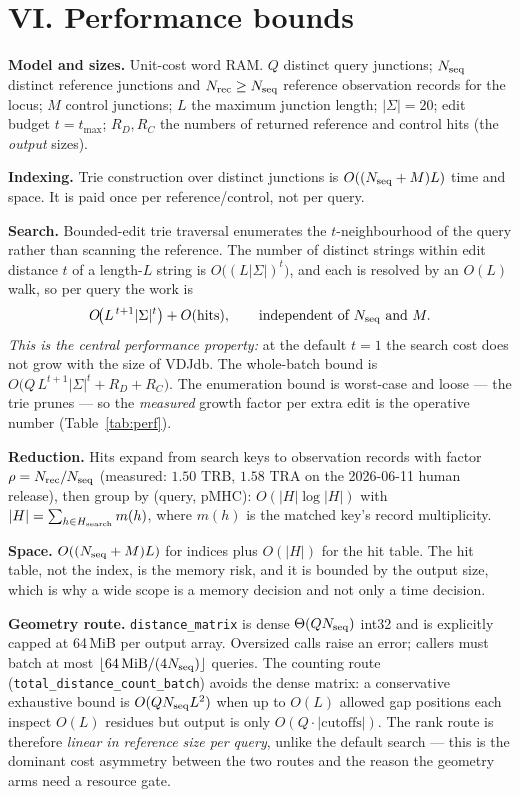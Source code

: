 \documentclass[10pt,a4paper]{article}
\theoremstyle{definition}
\newcommand{\code}[1]{\texttt{\small #1}}
\begin{document}
\part*{VI. Performance bounds}
\label{sec:perf}

\textbf{Model and sizes.} Unit-cost word RAM. $Q$ distinct query junctions; $N_{\rm seq}$ distinct
reference junctions and $N_{\rm rec}\ge N_{\rm seq}$ reference observation records for the locus;
$M$ control junctions; $L$ the maximum junction length; $|\Sigma|=20$; edit budget $t=t_{\max}$;
$R_D,R_C$ the numbers of returned reference and control hits (the \emph{output} sizes).

\textbf{Indexing.} Trie construction over distinct junctions is $O((N_{\rm seq}+M)L)$ time and
space. It is paid once per reference/control, not per query.

\textbf{Search.} Bounded-edit trie traversal enumerates the $t$-neighbourhood of the query rather
than scanning the reference. The number of distinct strings within edit distance $t$ of a length-$L$
string is $O\!\big((L|\Sigma|)^t\big)$, and each is resolved by an $O(L)$ walk, so per query the
work is
\[
O\!\big(L^{\,t+1}|\Sigma|^{t}\big)+O(\text{hits}),\qquad\text{independent of } N_{\rm seq}\text{ and } M .
\]
\emph{This is the central performance property:} at the default $t=1$ the search cost does not grow
with the size of VDJdb. The whole-batch bound is
$O\!\big(Q\,L^{t+1}|\Sigma|^{t}+R_D+R_C\big)$. The enumeration bound is worst-case and loose --- the
trie prunes --- so the \emph{measured} growth factor per extra edit is the operative number
(Table~\ref{tab:perf}).

\textbf{Reduction.} Hits expand from search keys to observation records with factor
$\rho=N_{\rm rec}/N_{\rm seq}$ (measured: $1.50$ TRB, $1.58$ TRA on the 2026-06-11 human release),
then group by (query, pMHC): $O(|H|\log|H|)$ with $|H|=\sum_{h\in H_{\rm search}}m(h)$, where $m(h)$ is the matched key's record multiplicity.

\textbf{Space.} $O((N_{\rm seq}+M)L)$ for indices plus $O(|H|)$ for the hit table. The hit table,
not the index, is the memory risk, and it is bounded by the output size, which is why a wide scope
is a memory decision and not only a time decision.

\textbf{Geometry route.} \code{distance\_matrix} is dense $\Theta(QN_{\rm seq})$ int32 and is
explicitly capped at 64\,MiB per output array. Oversized calls raise an error; callers must batch at most
$\lfloor 64\,\text{MiB}/(4N_{\rm seq})\rfloor$ queries. The counting route
(\code{total\_distance\_count\_batch}) avoids the dense matrix: a conservative exhaustive bound is
$O(QN_{\rm seq}L^2)$ when up to $O(L)$ allowed gap positions each inspect $O(L)$ residues but output is only $O(Q\cdot|\text{cutoffs}|)$. The rank route is therefore
\emph{linear in reference size per query}, unlike the default search --- this is the dominant cost
asymmetry between the two routes and the reason the geometry arms need a resource gate.
\end{document}
